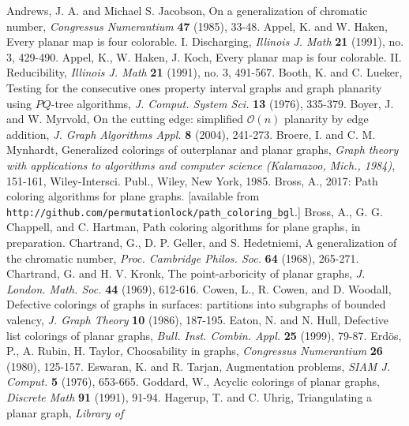 \documentclass[letterpaper, 12pt]{article}
\theoremstyle{thm}
\begin{document}
\begin{thebibliography}{99}
	Andrews, J. A. and Michael S. Jacobson, On a generalization of chromatic number,
	\textit{Congressus Numerantium} \textbf{47} (1985), 33-48.
	Appel, K. and W. Haken, Every planar map is four colorable. I.
	Discharging, \textit{Illinois J. Math} \textbf{21} (1991), no. 3, 429-490.
	Appel, K., W. Haken, J. Koch, Every planar map is four colorable. II.
	Reducibility, \textit{Illinois J. Math} \textbf{21} (1991), no. 3, 491-567.
	Booth, K. and C. Lueker, Testing for the consecutive ones property interval
	graphs and graph planarity using $PQ$-tree algorithms, \textit{J. Comput.
	System Sci.} \textbf{13} (1976), 335-379.
	Boyer, J. and W. Myrvold, On the cutting edge: simplified $\mathcal{O}(n)$ planarity by
	edge addition, \textit{J. Graph Algorithms Appl.} \textbf{8} (2004), 241-273.
	Broere, I. and C. M. Mynhardt, Generalized colorings of outerplanar and planar
	graphs, \textit{Graph theory with applications to algorithms and computer
	science (Kalamazoo, Mich., 1984)}, 151-161, Wiley-Intersci. Publ., Wiley,
	New York, 1985.
    Bross, A., 2017: Path coloring algorithms for plane graphs.
    [available from\hfil\break
    \texttt{http://github.com/permutationlock/path\_coloring\_bgl}.]
    Bross, A., G. G. Chappell, and C. Hartman, Path
    coloring algorithms for plane graphs, in preparation.
	Chartrand, G., D. P. Geller, and S. Hedetniemi, A generalization of the
	chromatic number, \textit{Proc. Cambridge Philos. Soc.} \textbf{64} (1968),
	265-271.
    Chartrand, G. and H. V. Kronk, The point-arboricity of planar graphs,
    \textit{J. London. Math. Soc.} \textbf{44} (1969), 612-616.
	Cowen, L., R. Cowen, and D. Woodall, Defective colorings of graphs in
	surfaces: partitions into subgraphs of bounded valency,
	\textit{J. Graph Theory} \textbf{10} (1986), 187-195.
	Eaton, N. and N. Hull, Defective list colorings of planar graphs,
	\emph{Bull. Inst. Combin. Appl.} \textbf{25} (1999), 79-87.
	Erd{\"o}s, P., A. Rubin, H. Taylor, Choosability in graphs,
	\textit{Congressus Numerantium} \textbf{26} (1980), 125-157.
	Eswaran, K. and R. Tarjan, Augmentation problems, \textit{SIAM J. Comput.}
	\textbf{5} (1976), 653-665.
    Goddard, W., Acyclic colorings of planar graphs, \textit{Discrete Math}
    \textbf{91} (1991), 91-94.
	Hagerup, T. and C. Uhrig, Triangulating a planar graph, \textit{Library of
}
\end{thebibliography}
\end{document}
